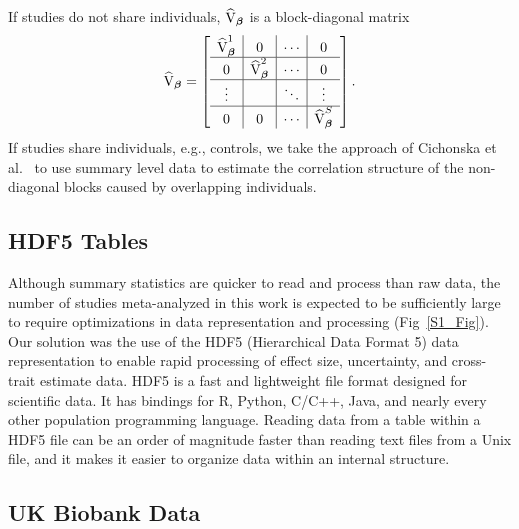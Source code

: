 If studies do not share individuals, $\widehat{\mathbf{\textrm{V}}}_{{\boldsymbol {\beta}}}$ is a block-diagonal matrix 
$$\widehat{\mathbf{\textrm{V}}}_{{\boldsymbol {\beta}}}=
 \left[\begin{array}{c|c|c|c}
 \widehat{\mathbf{\textrm{V}}}^{1}_{{\boldsymbol \beta}} & 0 & \cdots &0\\ \hline
0 & \widehat{\mathbf{\textrm{V}}}^{2}_{{\boldsymbol \beta}}&\cdots &0 \\ \hline
\vdots & &\ddots &\vdots \\ \hline
0 & 0 &\cdots & \widehat{\mathbf{\textrm{V}}}^{S}_{{\boldsymbol {\beta}}}\\
\end{array}\right].$$
If studies share individuals, e.g., controls, 
we take the approach of Cichonska et al.~\cite{cichonska2016metacca} to use summary level data
to estimate the correlation structure of the non-diagonal blocks caused by overlapping individuals. 

\subsection*{HDF5 Tables}
Although summary statistics are quicker to read and process than raw data, the number of studies meta-analyzed in this work is expected to be sufficiently large to require optimizations in data representation and processing (Fig~\ref{S1_Fig}). Our solution was the use of the HDF5 (Hierarchical Data Format 5) data representation to enable rapid processing of effect size, uncertainty, and cross-trait estimate data. HDF5 is a fast and lightweight file format designed for scientific data. It has bindings for R, Python, C/C++, Java, and nearly every other population programming language. Reading data from a table within a HDF5 file can be an order of magnitude faster than reading text files from a Unix file, and it makes it easier to organize data within an internal structure.

\subsection*{UK Biobank Data}
